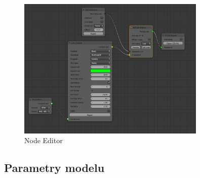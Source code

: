 \documentclass[a4paper,12pt]{article}
\begin{document}
	\begin{figure}[h]
	\centering
	\includegraphics[width=0.8\textwidth]{node_editor}
	\caption{Node Editor}
	\label{node_editor}
	\end{figure}


	\subsection{Parametry modelu}
	\label{sec:parametry_modelu}
	
\end{document}
